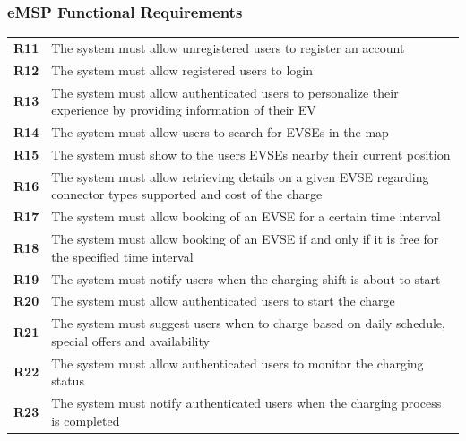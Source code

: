 \subsubsection{eMSP Functional Requirements}
\begin{table}[H]
    \begin{tabularx}{\textwidth}{cX}
        \toprule
        \textbf{R11} & The system must allow unregistered users to register an account                                                     \\
        \textbf{R12} & The system must allow registered users to login                                                                     \\
        \textbf{R13} & The system must allow authenticated users to personalize their experience by providing information of their EV      \\
        \textbf{R14} & The system must allow users to search for EVSEs in the map                                                          \\
        \textbf{R15} & The system must show to the users EVSEs nearby their current position                                               \\
        \textbf{R16} & The system must allow retrieving details on a given EVSE regarding connector types supported and cost of the charge \\
        \textbf{R17} & The system must allow booking of an EVSE for a certain time interval                                                \\
        \textbf{R18} & The system must allow booking of an EVSE if and only if it is free for the specified time interval                  \\
        \textbf{R19} & The system must notify users when the charging shift is about to start                                              \\
        \textbf{R20} & The system must allow authenticated users to start the charge                                                       \\
        \textbf{R21} & The system must suggest users when to charge based on daily schedule, special offers and availability               \\
        \textbf{R22} & The system must allow authenticated users to monitor the charging status                                            \\
        \textbf{R23} & The system must notify authenticated users when the charging process is completed                                   \\

\end{tabularx}
\end{table}
